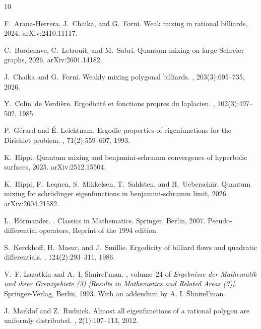 \documentclass[11pt,twoside,reqno]{amsart}
\newcommand{\1}{\mathrm{\mathbf{1}}}
\numberwithin{equation}{section}
\theoremstyle{plain}
\theoremstyle{definition}
\theoremstyle{remark}
\begin{document}
\begin{thebibliography}{10}

F.~Arana-Herrera, J.~Chaika, and G.~Forni.
\newblock Weak mixing in rational billiards, 2024.
\newblock arXiv:2410.11117.

C.~Bordenave, C.~Letrouit, and M.~Sabri.
\newblock Quantum mixing on large {S}chreier graphs, 2026.
\newblock arXiv:2601.14182.

J.~Chaika and G.~Forni.
\newblock Weakly mixing polygonal billiards.
, 203(3):695--735, 2026.

Y.~Colin~de Verdi\`ere.
\newblock Ergodicit\'e{} et fonctions propres du laplacien.
, 102(3):497--502, 1985.

P.~G\'erard and \'E. Leichtnam.
\newblock Ergodic properties of eigenfunctions for the {D}irichlet problem.
, 71(2):559--607, 1993.

K.~Hippi.
\newblock Quantum mixing and benjamini-schramm convergence of hyperbolic surfaces, 2025.
\newblock arXiv:2512.15504.

K.~Hippi, F.~Lequen, S.~Mikkelsen, T.~Sahlsten, and H.~Uebersch\"ar.
\newblock Quantum mixing for schr\"odinger eigenfunctions in benjamini-schramm limit, 2026.
\newblock arXiv:2604.21582.

L.~H\"ormander.
.
\newblock Classics in Mathematics. Springer, Berlin, 2007.
\newblock Pseudo-differential operators, Reprint of the 1994 edition.

S.~Kerckhoff, H.~Masur, and J.~Smillie.
\newblock Ergodicity of billiard flows and quadratic differentials.
, 124(2):293--311, 1986.

V.~F. Lazutkin and A.~I. {\v{S}}hnirel'man.
, volume~24 of {\em Ergebnisse der Mathematik und ihrer Grenzgebiete (3) [Results in Mathematics and Related Areas (3)]}.
\newblock Springer-Verlag, Berlin, 1993.
\newblock With an addendum by A. I. {\v{S}}hnirel'man.

J.~Marklof and Z.~Rudnick.
\newblock Almost all eigenfunctions of a rational polygon are uniformly distributed.
, 2(1):107--113, 2012.


\end{thebibliography}
\end{document}
